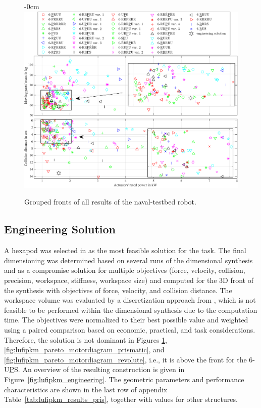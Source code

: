 \begin{figure}[H]
\begin{adjustwidth}{-\extralength}{0cm}
  \centering
  \includegraphics{Figures/lufipkm_pareto_3obj_combined.pdf}
\end{adjustwidth}
\caption{Grouped  fronts of all results of the naval-testbed robot.}
\label{fig:lufipkm_pareto_power_mass_groups}
\end{figure}

\subsection{Engineering Solution}
\label{sec:eval_lufi_engsol}

A hexapod was selected in \cite{Fettin2023_M1174} as the most feasible solution for the task.
The final dimensioning was determined based on several runs of the dimensional synthesis and as a compromise solution for multiple objectives (force, velocity, collision, precision, workspace, stiffness, workspace size) and computed for the 3D  front of the synthesis with objectives of force, velocity, and collision distance.
The workspace volume was evaluated by a discretization approach from \cite{TartariFilhoCab2005,GharahsoflooRah2015}, which is not feasible to be performed within the dimensional synthesis due to the computation time. 
The objectives were normalized to their best possible value and weighted using a paired comparison based on economic, practical, and task considerations.
Therefore, the solution is not dominant in Figures \ref{fig:lufipkm_pareto_power_mass_groups}, \ref{fig:lufipkm_pareto_motordiagram_prismatic}, and \ref{fig:lufipkm_pareto_motordiagram_revolute}, {i.e., it is above the  front for the 6-U\underline{P}S.}
An overview of the resulting construction is given in Figure~\ref{fig:lufipkm_engineering}.
The geometric parameters and performance characteristics are shown in the last row of appendix Table~\ref{tab:lufipkm_results_pris}, together with values for other structures.

